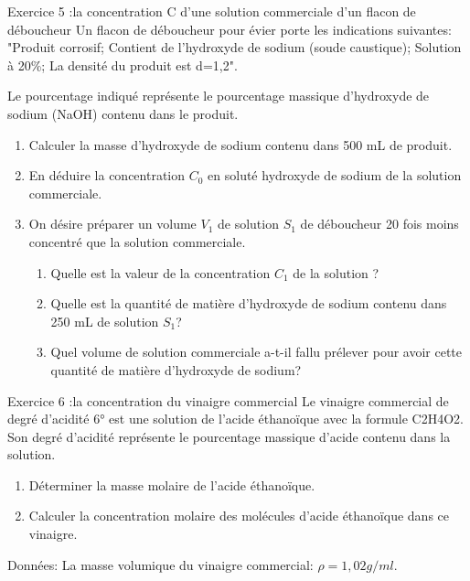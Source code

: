 \documentclass[12pt, french]{article}
\begin{document}
\begin{Box2}{Exercice 5 :la concentration C d'une solution commerciale d'un flacon de déboucheur }
Un flacon de déboucheur pour évier porte les indications suivantes: "Produit corrosif; Contient de l’hydroxyde de sodium (soude caustique); Solution à 20\%; La densité du produit est d=1,2".

Le pourcentage indiqué représente le pourcentage massique d’hydroxyde de sodium (NaOH) contenu
dans le produit.
\begin{enumerate}
\item Calculer la masse d’hydroxyde de sodium contenu dans 500 mL de produit.
\item  En déduire la concentration $C_0$ en soluté hydroxyde de sodium de la solution commerciale.
\item  On désire préparer un volume $V_1$ de solution $S_1$ de déboucheur 20 fois moins concentré que la
solution commerciale.
\begin{enumerate}
\item Quelle est la valeur de la concentration $C_1$ de la solution ?
\item Quelle est la quantité de matière d’hydroxyde de sodium contenu dans 250 mL de solution $S_1$?
\item Quel volume de solution commerciale a-t-il fallu prélever pour avoir cette quantité de matière
d’hydroxyde de sodium?
\end{enumerate}
\end{enumerate}
\end{Box2}

\begin{Box2}{Exercice 6 :la concentration du vinaigre commercial}
	Le vinaigre commercial de degré d'acidité 6° est une solution de l'acide éthanoïque avec la formule
C2H4O2. Son degré d'acidité représente le pourcentage massique d'acide contenu dans la solution.
\begin{enumerate}
\item Déterminer la masse molaire de l'acide éthanoïque.
\item Calculer la concentration molaire des molécules d'acide éthanoïque dans ce vinaigre.
\end{enumerate}
Données: La masse volumique du vinaigre commercial: $\rho = 1,02 g/ml$.


\end{Box2}
\end{document}
